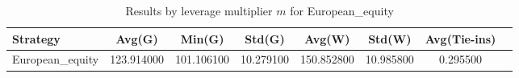 \begin{table}
\caption{Results by leverage multiplier $m$ for European_equity}
\label{tab:guarantee_results_L}
\begin{tabular}{lccccccc}
\toprule
Strategy & Avg(G) & Min(G) & Std(G) & Avg(W) & Std(W) & Avg(Tie-ins) \\
\midrule
European_equity & 123.914000 & 101.106100 & 10.279100 & 150.852800 & 10.985800 & 0.295500 \\
\bottomrule
\end{tabular}
\end{table}
